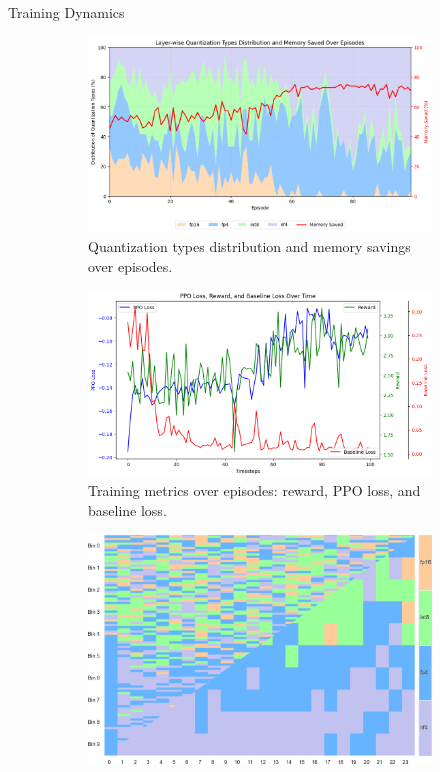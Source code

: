 \documentclass[final]{beamer}
\newlength{\colwidth}
\begin{document}
\begin{frame}[t]
\begin{columns}[t]
\begin{column}{\colwidth}
				
				\begin{block}{Training Dynamics}
					\vspace{-0.6em}
					\begin{figure}[ht]
						\centering
						\begin{subfigure}[b]{0.3\linewidth}
							\includegraphics[width=\linewidth]{layer_quantization_plot.png}
							\caption{\small Quantization types distribution and memory savings over episodes.}
						\end{subfigure}
						\hfill
						\begin{subfigure}[b]{0.32\linewidth}
							\includegraphics[width=\linewidth]{losses_plot.png}
							\caption{\small Training metrics over episodes: reward, PPO loss, and baseline loss.}
						\end{subfigure}
						\hfill
						\begin{subfigure}[b]{0.27\linewidth}
							\includegraphics[width=\linewidth]{binnobin.png}

\end{subfigure}
\end{figure}
\end{block}
\end{column}
\end{columns}
\end{frame}
\end{document}
